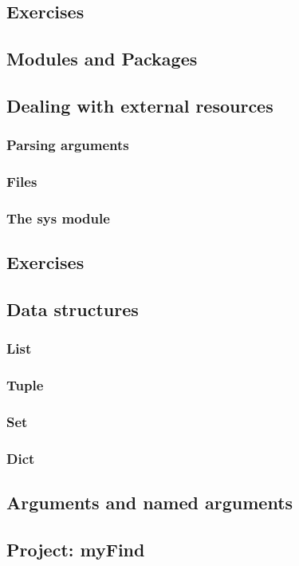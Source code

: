 \subsection{Exercises}

\subsection{Modules and Packages}

\subsection{Dealing with external resources}
\subsubsection{Parsing arguments}
\subsubsection{Files}
\subsubsection{The sys module}

\subsection{Exercises}

\subsection{Data structures}
\subsubsection{List}
\subsubsection{Tuple}
\subsubsection{Set}
\subsubsection{Dict}

\subsection{Arguments and named arguments}

\subsection{Project: myFind}
